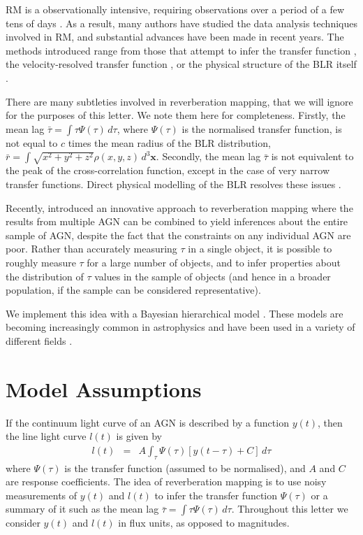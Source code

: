 \documentclass[useAMS,usenatbib]{mn2e}
\begin{document}
RM is a observationally intensive, requiring observations over a period of
a few tens of days \citep{2013ApJ...769..128B}. As a result, many authors have
studied the data analysis techniques involved in RM, and substantial
advances have been made in recent years.
The methods introduced range from those that attempt to infer the
transfer function \citep[the distribution of lags in a single object,
e.g.][]{1995ApJ...440..166K, 2011ApJ...735...80Z},
the velocity-resolved transfer function
\citep{2010ApJ...720L..46B}, or the physical structure of the BLR itself
\citep{pancoast, arp151, pancoast2, 2013arXiv1310.3907L}.

There are many subtleties involved in reverberation mapping, that we will ignore
for the purposes of this letter. We note them here for completeness. Firstly,
the mean lag $\bar{\tau} = \int \tau\Psi(\tau)\, d\tau$, where $\Psi(\tau)$
is the normalised transfer function, is not equal to $c$ times the mean radius of the BLR
distribution, $\bar{r} = \int \sqrt{x^2+y^2+z^2}\rho(x, y, z)\, d^3 \mathbf{x}$.
Secondly, the mean lag $\bar{\tau}$ is not equivalent to the peak of the
cross-correlation function, except in the case of very narrow
transfer functions. Direct physical modelling of the BLR resolves these
issues \citep{pancoast, arp151}.

Recently, \citet{2012MNRAS.427.2701F, 2013MNRAS.434L..16F} introduced an
innovative approach to reverberation mapping where the results from multiple
AGN can be combined to yield inferences about the entire sample of AGN,
despite the fact that the constraints on any individual AGN are poor. Rather
than accurately measuring $\tau$ in a single object, it is possible to roughly
measure $\tau$ for a large number of objects, and to infer properties about
the distribution of $\tau$ values in the sample of objects (and hence in
a broader population, if the sample can be considered representative).

We implement this idea with a Bayesian hierarchical model
\citep{2012arXiv1208.3036L}.
These models are becoming increasingly common in astrophysics and have been
used in a variety of different fields
\citep[e.g.][]{loredo, kelly, extreme_deconvolution, 2012AJ....143...90S, 2013arXiv1310.5177B, 2013AJ....146....7B}.

\section{Model Assumptions}
If the continuum light curve of an AGN
is described by a function $y(t)$, then the line
light curve $l(t)$ is given by
\begin{eqnarray}
l(t) &=& A \int_\tau \Psi(\tau)\left[y(t - \tau) + C\right] \, d\tau
\end{eqnarray}
where $\Psi(\tau)$ is the transfer function (assumed to be normalised),
and $A$ and $C$ are response
coefficients. The idea of reverberation mapping is to use noisy measurements
of $y(t)$ and $l(t)$ to infer the transfer function $\Psi(\tau)$ or a summary
of it such as the mean lag $\bar{\tau} = \int \tau\Psi(\tau) \, d\tau$.
Throughout this letter we consider $y(t)$ and $l(t)$ in flux
units, as opposed to magnitudes.
\end{document}

